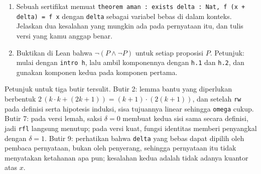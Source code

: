 \begin{latihan}
\begin{enumerate}
  \item Sebuah sertifikat memuat \texttt{theorem aman : exists delta : Nat, f (x + delta) = f x}
        dengan \texttt{delta} sebagai variabel bebas di dalam konteks. Jelaskan dua kesalahan
        yang mungkin ada pada pernyataan itu, dan tulis versi yang kamu anggap benar.

  \item Buktikan di Lean bahwa $\neg(P\wedge\neg P)$ untuk setiap proposisi $P$. Petunjuk: mulai
        dengan \texttt{intro h}, lalu ambil komponennya dengan \texttt{h.1} dan \texttt{h.2}, dan
        gunakan komponen kedua pada komponen pertama.
\end{enumerate}

Petunjuk untuk tiga butir tersulit. Butir 2: lemma bantu yang diperlukan berbentuk
$2\,(k\cdot k+(2k+1))=(k+1)\cdot(2(k+1))$, dan setelah \texttt{rw} pada definisi serta hipotesis
induksi, sisa tujuannya linear sehingga \texttt{omega} cukup. Butir 7: pada versi lemah, saksi
$\delta=0$ membuat kedua sisi sama secara definisi, jadi \texttt{rfl} langsung menutup; pada versi
kuat, fungsi identitas memberi penyangkal dengan $\delta=1$. Butir 9: perhatikan bahwa
\texttt{delta} yang bebas dapat dipilih oleh pembaca pernyataan, bukan oleh penyerang, sehingga
pernyataan itu tidak menyatakan ketahanan apa pun; kesalahan kedua adalah tidak adanya kuantor
atas $x$.
\end{latihan}

